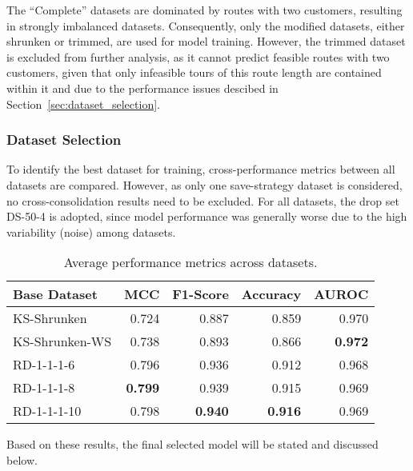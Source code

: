 The “Complete” datasets are dominated by routes with two customers, resulting in strongly imbalanced datasets. Consequently,
only the modified datasets, either shrunken or trimmed, are used for model training. However, the trimmed dataset is excluded
from further analysis, as it cannot predict feasible routes with two customers, given that only infeasible tours of this route
length are contained within it and due to the performance issues descibed in Section~\ref{sec:dataset_selection}.

\subsubsection{Dataset Selection}

To identify the best dataset for training, cross-performance metrics between all datasets are compared. However,
as only one save-strategy dataset is considered, no cross-consolidation results need to be excluded. For all datasets,
the drop set DS-50-4 is adopted, since model performance was generally worse due to the high variability (noise) among datasets.

\begin{table}[ht]
    \centering
    \small
    \begin{tabular}{lrrrr}
        \toprule
        Base Dataset   & MCC            & F1-Score       & Accuracy       & AUROC          \\
        \midrule
        KS-Shrunken    & 0.724          & 0.887          & 0.859          & 0.970          \\
        KS-Shrunken-WS & 0.738          & 0.893          & 0.866          & \textbf{0.972} \\
        RD-1-1-1-6     & 0.796          & 0.936          & 0.912          & 0.968          \\
        RD-1-1-1-8     & \textbf{0.799} & 0.939          & 0.915          & 0.969          \\
        RD-1-1-1-10    & 0.798          & \textbf{0.940} & \textbf{0.916} & 0.969          \\
        \bottomrule
    \end{tabular}
    \caption{Average performance metrics across \krebsADataSetText datasets.}
    \label{tab:featurePerformance_krebs}
\end{table}
\parbreak
Based on these results, the final selected model will be stated and discussed below.

